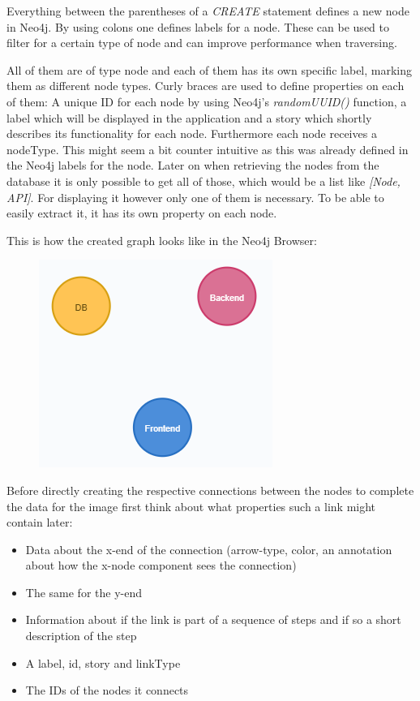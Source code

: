 Everything between the parentheses of a \emph{CREATE} statement defines a new node in Neo4j. By using colons one defines labels for a node. These can be used to filter for a certain type of node and can improve performance when traversing. 

All of them are of type node and each of them has its own specific label, marking them as different node types. Curly braces are used to define properties on each of them: A unique ID for each node by using Neo4j's \emph{randomUUID()} function, a label which will be displayed in the application and a story which shortly describes its functionality for each node. Furthermore each node receives a nodeType. This might seem a bit counter intuitive as this was already defined in the Neo4j labels for the node.
Later on when retrieving the nodes from the database it is only possible to get all of those, which would be a list like \emph{[Node, API]}. For displaying it however only one of them is necessary. To be able to easily extract it, it has its own property on each node.

\newpage
This is how the created graph looks like in the Neo4j Browser:
\begin{figure}[H]
\centering
\includegraphics[scale=1]{Bilder/BasicGraphNeo1.png}
\label{ex422}
\end{figure}

Before directly creating the respective connections between the nodes to complete the data for the image first think about what properties such a link might contain later:
\begin{itemize}
\item Data about the x-end of the connection (arrow-type, color, an annotation about how the x-node component sees the connection)
\item The same for the y-end
\item Information about if the link is part of a sequence of steps and if so a short description of the step
\item A label, id, story and linkType
\item The IDs of the nodes it connects
\end{itemize}

